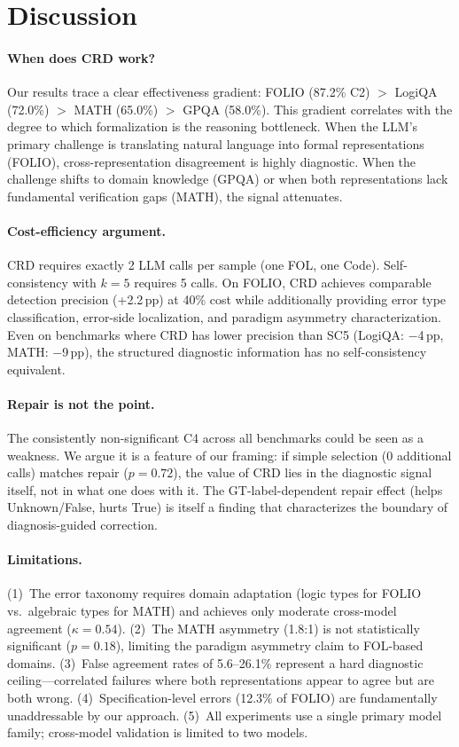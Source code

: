 \documentclass[11pt,a4paper]{article}
\newcommand{\method}{CRD}
\newcommand{\pp}{\,pp}
\begin{document}
\section{Discussion}

\paragraph{When does CRD work?}
Our results trace a clear effectiveness gradient: FOLIO (87.2\% C2) $>$ LogiQA (72.0\%) $>$ MATH (65.0\%) $>$ GPQA (58.0\%).
This gradient correlates with the degree to which formalization is the reasoning bottleneck.
When the LLM's primary challenge is translating natural language into formal representations (FOLIO), cross-representation disagreement is highly diagnostic.
When the challenge shifts to domain knowledge (GPQA) or when both representations lack fundamental verification gaps (MATH), the signal attenuates.

\paragraph{Cost-efficiency argument.}
\method{} requires exactly 2 LLM calls per sample (one FOL, one Code).
Self-consistency with $k{=}5$ requires 5 calls.
On FOLIO, \method{} achieves comparable detection precision (+2.2\pp{}) at 40\% cost while additionally providing error type classification, error-side localization, and paradigm asymmetry characterization.
Even on benchmarks where \method{} has lower precision than SC5 (LogiQA: $-$4\pp{}, MATH: $-$9\pp{}), the structured diagnostic information has no self-consistency equivalent.

\paragraph{Repair is not the point.}
The consistently non-significant C4 across all benchmarks could be seen as a weakness.
We argue it is a feature of our framing: if simple selection (0 additional calls) matches repair ($p{=}0.72$), the value of \method{} lies in the diagnostic signal itself, not in what one does with it.
The GT-label-dependent repair effect (helps Unknown/False, hurts True) is itself a finding that characterizes the boundary of diagnosis-guided correction.

\paragraph{Limitations.}
(1)~The error taxonomy requires domain adaptation (logic types for FOLIO vs.\ algebraic types for MATH) and achieves only moderate cross-model agreement ($\kappa{=}0.54$).
(2)~The MATH asymmetry (1.8:1) is not statistically significant ($p{=}0.18$), limiting the paradigm asymmetry claim to FOL-based domains.
(3)~False agreement rates of 5.6--26.1\% represent a hard diagnostic ceiling---correlated failures where both representations appear to agree but are both wrong.
(4)~Specification-level errors (12.3\% of FOLIO) are fundamentally unaddressable by our approach.
(5)~All experiments use a single primary model family; cross-model validation is limited to two models.
\end{document}
